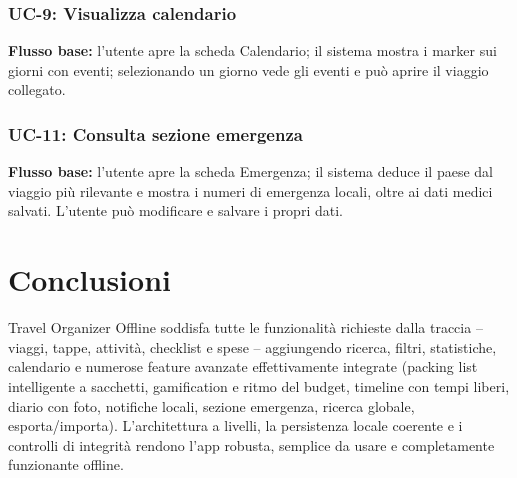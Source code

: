\documentclass[11pt, a4paper]{article}
\begin{document}
\subsubsection*{UC-9: Visualizza calendario}
\textbf{Flusso base:} l'utente apre la scheda Calendario; il sistema mostra i
marker sui giorni con eventi; selezionando un giorno vede gli eventi e può aprire
il viaggio collegato.

\subsubsection*{UC-11: Consulta sezione emergenza}
\textbf{Flusso base:} l'utente apre la scheda Emergenza; il sistema deduce il
paese dal viaggio più rilevante e mostra i numeri di emergenza locali, oltre ai
dati medici salvati. L'utente può modificare e salvare i propri dati.

\section{Conclusioni}
Travel Organizer Offline soddisfa tutte le funzionalità richieste dalla traccia
-- viaggi, tappe, attività, checklist e spese -- aggiungendo ricerca, filtri,
statistiche, calendario e numerose feature avanzate effettivamente integrate
(packing list intelligente a sacchetti, gamification e ritmo del budget, timeline
con tempi liberi, diario con foto, notifiche locali, sezione emergenza, ricerca
globale, esporta/importa). L'architettura a livelli, la persistenza locale
coerente e i controlli di integrità rendono l'app robusta, semplice da usare e
completamente funzionante offline.
\end{document}
